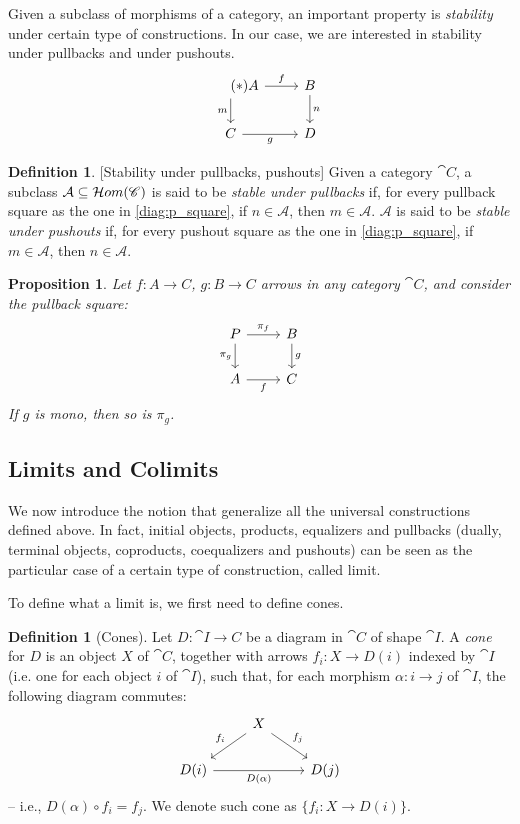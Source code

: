 \documentclass[a4paper, twoside,openright]{report}
\theoremstyle{plain}
\newtheorem{prop}[theorem]{Proposition}
\theoremstyle{definition}
\newtheorem{definition}[theorem]{Definition}
\begin{document}
Given a subclass of morphisms of a category, an important property is \emph{stability} under certain type of constructions. In our case, we are interested in stability under pullbacks and under pushouts.
\[
    \begin{tikzcd}\label{diag:p_square}\tag{$\ast$}
        A \arrow[r, "f"] \arrow[d, "m"swap] & B \arrow[d, "n"] \\
        C \arrow[r, "g" swap] & D
    \end{tikzcd}
\]
\begin{definition}\label{def:stab_under_pb_po}[Stability under pullbacks, pushouts]
    Given a category $\cat C$, a subclass $\mathcal{A} \subseteq \mathcal{H}om(\mathscr{C})$ is said to be \emph{stable under pullbacks} if, for every pullback square as the one in \eqref{diag:p_square}, if $n \in \mathcal{A}$, then $m \in \mathcal{A}$.
    $\mathcal A$ is said to be \emph{stable under pushouts} if, for every pushout square as the one in \eqref{diag:p_square}, if $m \in \mathcal{A}$, then $n \in \mathcal{A}$.
\end{definition}

\begin{prop}\label{prop:monos_pres_by_pullback}
    Let $f: A \rightarrow C$, $g: B \rightarrow C$ arrows in any category $\cat C$, and consider the pullback square:
    $$
        \begin{tikzcd}
            P \arrow[r, "{\pi_f}"] \arrow[d, "{\pi_g}"swap] & B \arrow[d, "g"] \\
            A \arrow[r, "f"swap] & C
        \end{tikzcd}
    $$
    If $g$ is mono, then so is $\pi_g$.
\end{prop}


\subsection{Limits and Colimits}

We now introduce the notion that generalize all the universal constructions defined above. In fact, initial objects, products, equalizers and pullbacks (dually, terminal objects, coproducts, coequalizers and pushouts) can be seen as the particular case of a certain type of construction, called limit.

To define what a limit is, we first need to define cones.

\begin{definition}[Cones]
    Let $D:\cat {I \rightarrow C}$ be a diagram in $\cat C$ of shape $\cat I$. A \emph{cone} for $D$ is an object $X$ of $\cat C$, together with arrows $f_i : X \rightarrow D(i)$ indexed by $\cat I$ (i.e. one for each object $i$ of $\cat I$), such that, for each morphism $\alpha: i \rightarrow j$ of $\cat I$, the following diagram commutes:
    \[
        \begin{tikzcd}
            & X \arrow[dl, "{f_i}"swap] \arrow[dr, "{f_j}"] & \\
            D(i) \arrow[rr, "{D(\alpha)}" swap] & & D(j)
        \end{tikzcd}
    \]
    -- i.e., $D(\alpha) \circ f_i = f_j$.
    We denote such cone as $\{f_i: X \rightarrow D(i)\}$.

\end{definition}
\end{document}
